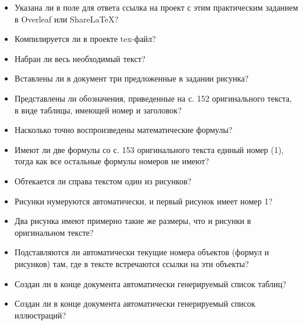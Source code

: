 \documentclass[a4paper,12pt]{article}
\begin{document}
\begin{itemize}
    \item Указана ли в поле для ответа ссылка на проект с этим практическим заданием в Overleaf или ShareLaTeX?
    \item Компилируется ли в проекте tex-файл?
    \item Набран ли весь необходимый текст?
    \item Вставлены ли в документ три предложенные в задании рисунка?
    \item Представлены ли обозначения, приведенные на с. 152 оригинального текста, в виде таблицы, имеющей номер и заголовок?
    \item Насколько точно воспроизведены математические формулы?
    \item Имеют ли две формулы со с. 153 оригинального текста единый номер (1), тогда как все остальные формулы номеров не имеют?
    \item Обтекается ли справа текстом один из рисунков?
    \item Рисунки нумеруются автоматически, и первый рисунок имеет номер 1?
    \item Два рисунка имеют примерно такие же размеры, что и рисунки в оригинальном тексте?
    \item Подставляются ли автоматически текущие номера объектов (формул и рисунков) там, где в тексте встречаются ссылки на эти объекты?
    \item Создан ли в конце документа автоматически генерируемый список таблиц?
    \item Создан ли в конце документа автоматически генерируемый список иллюстраций?
\end{itemize}
\end{document}
